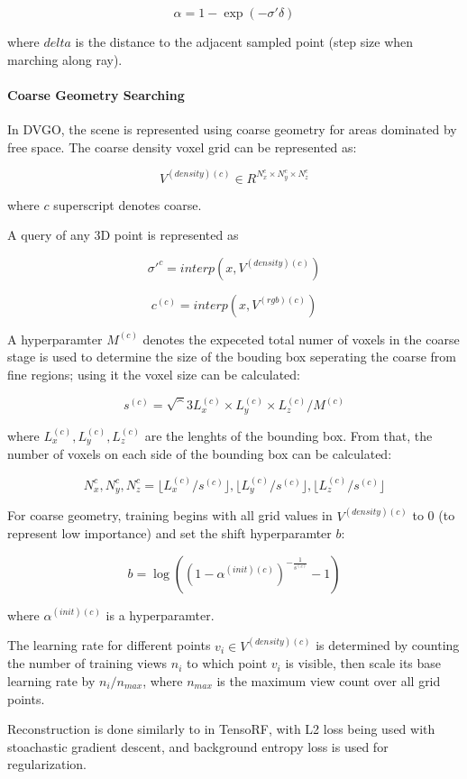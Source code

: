 \documentclass[conference]{IEEEtran}
\begin{document}
\[\alpha = 1 - \exp(-\sigma'\delta)\]

where \(delta\) is the distance to the adjacent sampled point (step size when
marching along ray).

\paragraph{Coarse Geometry Searching}

In DVGO, the scene is represented using coarse geometry for areas dominated by free space.
The coarse density voxel grid can be represented as:

\[V^{(density)(c)} \in R^{N_x^c \times N_y^c \times N_z^c}\]

where \(c\) superscript denotes coarse.

A query of any 3D point is represented as

\[\sigma'^{c} = interp(x,V^{(density)(c)})\]

\[c^{(c)} = interp(x,V^{(rgb)(c)})\]


A hyperparamter \(M^{(c)}\) denotes the expeceted total numer of voxels in the coarse stage
is used to determine the size of the bouding box
seperating the coarse from fine regions; using it the voxel size can be calculated:

\[s^{(c)} = \sqrt^3{L_x^{(c)} \times L_y^{(c)} \times L_z^{(c)} / M^{(c)}}\]

where \(L_x^{(c)}, L_y^{(c)}, L_z^{(c)}\) are the lenghts of the bounding box. From that,
the number of voxels on each side of the bounding box can be calculated:

\[N_x^{c}, N_y^{c}, N_z^{c} = \lfloor L_x^{(c)} / s^{(c)} \rfloor, \lfloor L_y^{(c)} / s^{(c)} \rfloor, \lfloor L_z^{(c)} / s^{(c)} \rfloor\]

For coarse geometry, training begins with all grid values in \(V^{(density)(c)}\) to 0
(to represent low importance) and set the shift hyperparamter \(b\):

\[b = \log((1 - \alpha^{(init)(c)})^{- \frac{1}{s^{(c)}}} - 1)\]

where \(\alpha^{(init)(c)}\) is a hyperparamter.

The learning rate for different points \(v_i \in V^{(density)(c)}\) is determined
by counting the number of training views \(n_i\) to which point \(v_i\) is visible,
then scale its base learning rate by \(n_i / n_{max}\), where \(n_{max}\) is the maximum
view count over all grid points.

Reconstruction is done similarly to in TensoRF, with L2 loss being used with stoachastic
gradient descent, and background entropy loss is used for regularization.
\end{document}
